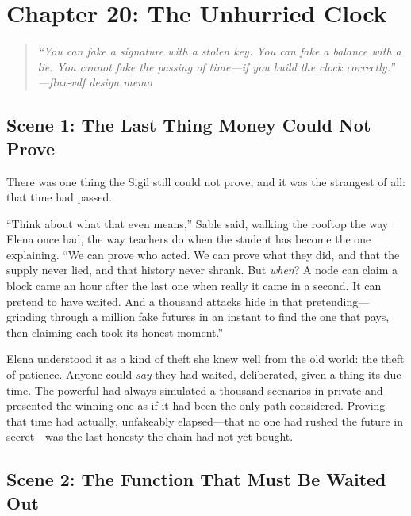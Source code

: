 \hypertarget{chapter-20-the-unhurried-clock}{%
\section{Chapter 20: The Unhurried
Clock}\label{chapter-20-the-unhurried-clock}}

\begin{quote}
\itshape ``You can fake a signature with a stolen key. You can fake a balance with
a lie. You cannot fake the passing of time---if you build the clock correctly.''\\
\normalfont\hfill---flux-vdf design memo
\end{quote}

\hypertarget{scene-1-the-last-thing-money-could-not-prove}{%
\subsection{Scene 1: The Last Thing Money Could Not
Prove}\label{scene-1-the-last-thing-money-could-not-prove}}

There was one thing the Sigil still could not prove, and it was the strangest of
all: that time had passed.

``Think about what that even means,'' Sable said, walking the rooftop the way Elena
once had, the way teachers do when the student has become the one explaining. ``We
can prove who acted. We can prove what they did, and that the supply never lied, and
that history never shrank. But \emph{when}? A node can claim a block came an hour
after the last one when really it came in a second. It can pretend to have waited.
And a thousand attacks hide in that pretending---grinding through a million fake
futures in an instant to find the one that pays, then claiming each took its honest
moment.''

Elena understood it as a kind of theft she knew well from the old world: the theft
of patience. Anyone could \emph{say} they had waited, deliberated, given a thing its
due time. The powerful had always simulated a thousand scenarios in private and
presented the winning one as if it had been the only path considered. Proving that
time had actually, unfakeably elapsed---that no one had rushed the future in
secret---was the last honesty the chain had not yet bought.

\hypertarget{scene-2-the-function-that-must-be-waited-out}{%
\subsection{Scene 2: The Function That Must Be Waited
Out}\label{scene-2-the-function-that-must-be-waited-out}}

